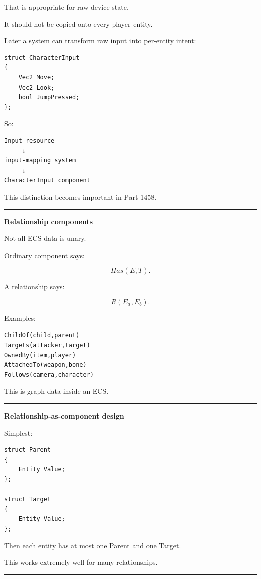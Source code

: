 That is appropriate for raw device state.

It should not be copied onto every player entity.

Later a system can transform raw input into per-entity intent:

\begin{verbatim}
struct CharacterInput
{
    Vec2 Move;
    Vec2 Look;
    bool JumpPressed;
};
\end{verbatim}

So:

\begin{verbatim}
Input resource
     ↓
input-mapping system
     ↓
CharacterInput component
\end{verbatim}

This distinction becomes important in Part 1458.

\begin{center}\rule{0.5\linewidth}{0.5pt}\end{center}

\textbf{Relationship components}

Not all ECS data is unary.

Ordinary component says:

\[
Has(E,T).
\]

A relationship says:

\[
R(E_a,E_b).
\]

Examples:

\begin{verbatim}
ChildOf(child,parent)
Targets(attacker,target)
OwnedBy(item,player)
AttachedTo(weapon,bone)
Follows(camera,character)
\end{verbatim}

This is graph data inside an ECS.

\begin{center}\rule{0.5\linewidth}{0.5pt}\end{center}

\textbf{Relationship-as-component design}

Simplest:

\begin{verbatim}
struct Parent
{
    Entity Value;
};

struct Target
{
    Entity Value;
};
\end{verbatim}

Then each entity has at most one Parent and one Target.

This works extremely well for many relationships.

\begin{center}\rule{0.5\linewidth}{0.5pt}\end{center}

